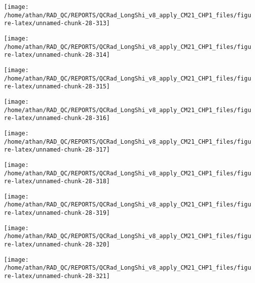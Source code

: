 \documentclass[
  10pt,
  a4paper,oneside]{article}
\begin{document}
\begin{center}\texttt{[image: /home/athan/RAD\_QC/REPORTS/QCRad\_LongShi\_v8\_apply\_CM21\_CHP1\_files/figure-latex/unnamed-chunk-28-313]} \end{center}

\begin{center}\texttt{[image: /home/athan/RAD\_QC/REPORTS/QCRad\_LongShi\_v8\_apply\_CM21\_CHP1\_files/figure-latex/unnamed-chunk-28-314]} \end{center}

\begin{center}\texttt{[image: /home/athan/RAD\_QC/REPORTS/QCRad\_LongShi\_v8\_apply\_CM21\_CHP1\_files/figure-latex/unnamed-chunk-28-315]} \end{center}

\begin{center}\texttt{[image: /home/athan/RAD\_QC/REPORTS/QCRad\_LongShi\_v8\_apply\_CM21\_CHP1\_files/figure-latex/unnamed-chunk-28-316]} \end{center}

\begin{center}\texttt{[image: /home/athan/RAD\_QC/REPORTS/QCRad\_LongShi\_v8\_apply\_CM21\_CHP1\_files/figure-latex/unnamed-chunk-28-317]} \end{center}

\begin{center}\texttt{[image: /home/athan/RAD\_QC/REPORTS/QCRad\_LongShi\_v8\_apply\_CM21\_CHP1\_files/figure-latex/unnamed-chunk-28-318]} \end{center}

\begin{center}\texttt{[image: /home/athan/RAD\_QC/REPORTS/QCRad\_LongShi\_v8\_apply\_CM21\_CHP1\_files/figure-latex/unnamed-chunk-28-319]} \end{center}

\begin{center}\texttt{[image: /home/athan/RAD\_QC/REPORTS/QCRad\_LongShi\_v8\_apply\_CM21\_CHP1\_files/figure-latex/unnamed-chunk-28-320]} \end{center}

\begin{center}\texttt{[image: /home/athan/RAD\_QC/REPORTS/QCRad\_LongShi\_v8\_apply\_CM21\_CHP1\_files/figure-latex/unnamed-chunk-28-321]} \end{center}
\end{document}
